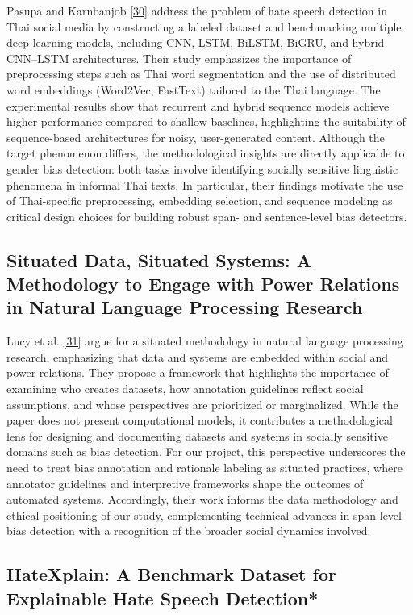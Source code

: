 \documentclass[12pt,oneside,openright,a4paper]{cpe-english-project}
\begin{document}
Pasupa and Karnbanjob \hyperlink{bib:ref30}{[30]} address the problem of hate speech detection in Thai social media by constructing a labeled dataset and benchmarking multiple deep learning models, including CNN, LSTM, BiLSTM, BiGRU, and hybrid CNN--LSTM architectures. Their study emphasizes the importance of preprocessing steps such as Thai word segmentation and the use of distributed word embeddings (Word2Vec, FastText) tailored to the Thai language. The experimental results show that recurrent and hybrid sequence models achieve higher performance compared to shallow baselines, highlighting the suitability of sequence-based architectures for noisy, user-generated content. Although the target phenomenon differs, the methodological insights are directly applicable to gender bias detection: both tasks involve identifying socially sensitive linguistic phenomena in informal Thai texts. In particular, their findings motivate the use of Thai-specific preprocessing, embedding selection, and sequence modeling as critical design choices for building robust span- and sentence-level bias detectors.

\subsection{Situated Data, Situated Systems: A Methodology to Engage with Power Relations in Natural Language Processing Research}

Lucy et al. \hyperlink{bib:ref31}{[31]} argue for a situated methodology in natural language processing research, emphasizing that data and systems are embedded within social and power relations. They propose a framework that highlights the importance of examining who creates datasets, how annotation guidelines reflect social assumptions, and whose perspectives are prioritized or marginalized. While the paper does not present computational models, it contributes a methodological lens for designing and documenting datasets and systems in socially sensitive domains such as bias detection. For our project, this perspective underscores the need to treat bias annotation and rationale labeling as situated practices, where annotator guidelines and interpretive frameworks shape the outcomes of automated systems. Accordingly, their work informs the data methodology and ethical positioning of our study, complementing technical advances in span-level bias detection with a recognition of the broader social dynamics involved.

\subsection{HateXplain: A Benchmark Dataset for Explainable Hate Speech Detection*}
\end{document}
